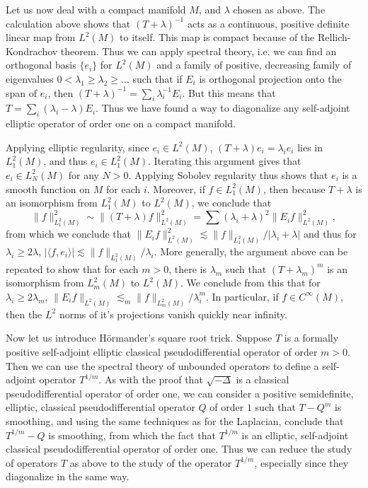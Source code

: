 Let us now deal with a compact manifold $M$, and $\lambda$ chosen as above. The calculation above shows that $(T + \lambda)^{-1}$ acts as a continuous, positive definite linear map from $L^2(M)$ to itself. This map is compact because of the Rellich-Kondrachov theorem. Thus we can apply spectral theory, i.e. we can find an orthogonal basis $\{ e_i \}$ for $L^2(M)$ and a family of positive, decreasing family of eigenvalues $0 < \lambda_1 \geq \lambda_2 \geq \dots$ such that if $E_i$ is orthogonal projection onto the span of $e_i$, then $(T + \lambda)^{-1} = \sum_i \lambda_i^{-1} E_i$. But this means that $T = \sum_i (\lambda_i - \lambda) E_i$. Thus we have found a way to diagonalize any self-adjoint elliptic operator of order one on a compact manifold.

Applying elliptic regularity, since $e_i \in L^2(M)$, $(T + \lambda) e_i = \lambda_i e_i$ lies in $L^2_1(M)$, and thus $e_i \in L^2_1(M)$. Iterating this argument gives that $e_i \in L^2_N(M)$ for any $N > 0$. Applying Sobolev regularity thus shows that $e_i$ is a smooth function on $M$ for each $i$. Moreover, if $f \in L^2_1(M)$, then because $T + \lambda$ is an isomorphism from $L^2_1(M)$ to $L^2(M)$, we conclude that
%
\[ \| f \|_{L^2_1(M)}^2 \sim \| (T + \lambda) f \|_{L^2(M)}^2 = \sum (\lambda_i + \lambda)^2 \| E_i f \|_{L^2(M)}^2, \]
%
from which we conclude that $\| E_i f \|_{L^2(M)}^2 \lesssim \| f \|_{L^2_1(M)} / |\lambda_i + \lambda|$ and thus for $\lambda_i \geq 2\lambda$, $|\langle f, e_i \rangle| \lesssim \| f \|_{L^2_1(M)} / \lambda_i$. More generally, the argument above can be repeated to show that for each $m > 0$, there is $\lambda_m$ such that $(T + \lambda_m)^m$ is an isomorphism from $L^2_m(M)$ to $L^2(M)$. We conclude from this that for $\lambda_i \geq 2 \lambda_m$, $\| E_i f \|_{L^2(M)} \lesssim_m \| f \|_{L^2_m(M)} / \lambda_i^m$. In particular, if $f \in C^\infty(M)$, then the $L^2$ norms of it's projections vanish quickly near infinity.

Now let us introduce H\"{o}rmander's square root trick. Suppose $T$ is a formally positive self-adjoint elliptic classical pseudodifferential operator of order $m > 0$. Then we can use the spectral theory of unbounded operators to define a self-adjoint operator $T^{1/m}$. As with the proof that $\sqrt{-\Delta}$ is a classical pseudodifferential operator of order one, we can consider a positive semidefinite, elliptic, classical pseudodifferential operator $Q$ of order $1$ such that $T - Q^m$ is smoothing, and using the same techniques as for the Laplacian, conclude that $T^{1/m} - Q$ is smoothing, from which the fact that $T^{1/m}$ is an elliptic, self-adjoint classical pseudodifferential operator of order one. Thus we can reduce the study of operators $T$ as above to the study of the operator $T^{1/m}$, especially since they diagonalize in the same way.


